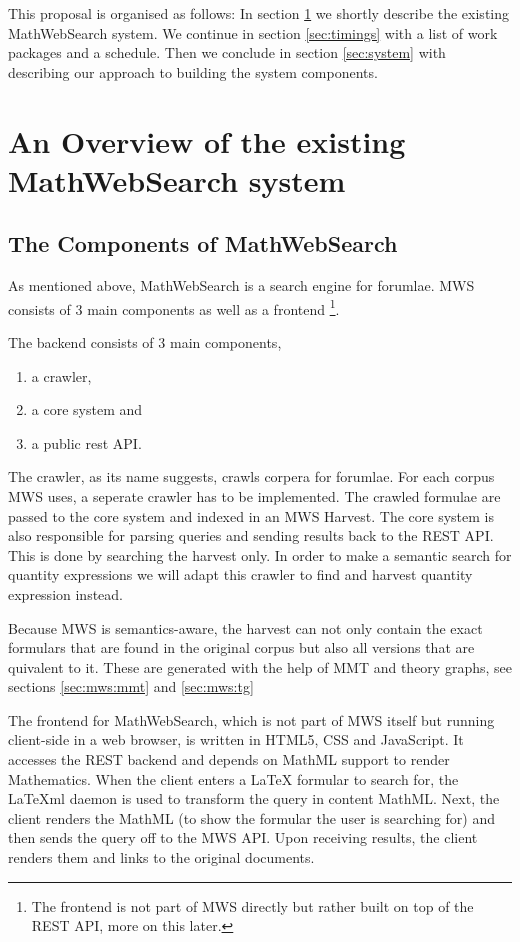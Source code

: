 \documentclass[11pt]{article}
\begin{document}
This proposal is organised as follows: In section \ref{sec:mws} we shortly describe the existing MathWebSearch system. We continue in section \ref{sec:timings} with a list of work packages and a schedule. Then we conclude in section \ref{sec:system} with describing our approach to building the system components.

\section{An Overview of the existing MathWebSearch system}
\label{sec:mws}

\subsection{The Components of MathWebSearch}

As mentioned above, MathWebSearch is a search engine for forumlae. MWS consists of 3 main components as well as a frontend \footnote{The frontend is not part of MWS directly but rather built on top of the REST API, more on this later. }\cite{KohPro:MWSmanual}.

The backend consists of 3 main components,
\begin{enumerate}
  \item a crawler,
  \item a core system and
  \item a public rest API.
\end{enumerate}

The crawler, as its name suggests, crawls corpera for forumlae. For each corpus MWS uses, a seperate crawler has to be implemented. The crawled formulae are passed to the core system and indexed in an MWS Harvest. The core system is also responsible for parsing queries and sending results back to the REST API. This is done by searching the harvest only. In order to make a semantic search for quantity expressions we will adapt this crawler to find and harvest quantity expression instead.

Because MWS is semantics-aware, the harvest can not only contain the exact formulars that are found in the original corpus but also all versions that are quivalent to it. These are generated with the help of MMT and theory graphs, see sections \ref{sec:mws:mmt} and \ref{sec:mws:tg}

The frontend for MathWebSearch, which is not part of MWS itself but running client-side in a web browser, is written in HTML5, CSS and JavaScript. It accesses the REST backend and depends on MathML support to render Mathematics. When the client enters a \LaTeX{} formular to search for, the \LaTeX{}ml daemon \cite{latexml-daemon} is used to transform the query in content MathML. Next, the client renders the MathML (to show the formular the user is searching for) and then sends the query off to the MWS API. Upon receiving results, the client renders them and links to the original documents.
\end{document}
